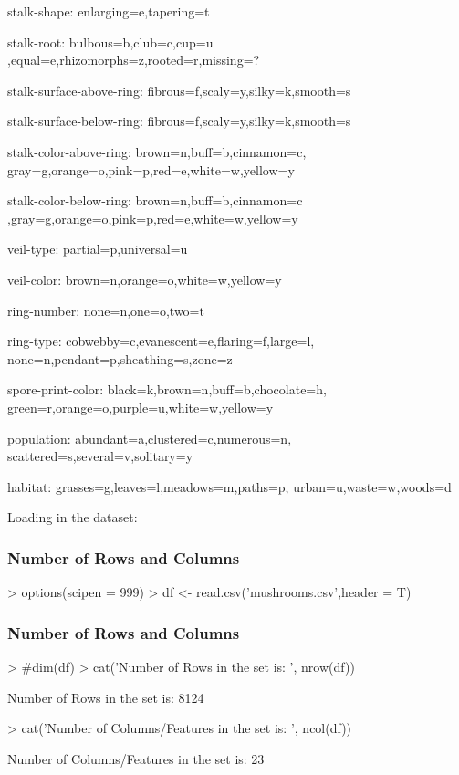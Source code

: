 \documentclass[12pt]{article}         %
\begin{document}
stalk-shape: enlarging=e,tapering=t

stalk-root: bulbous=b,club=c,cup=u
,equal=e,rhizomorphs=z,rooted=r,missing=?

stalk-surface-above-ring: fibrous=f,scaly=y,silky=k,smooth=s

stalk-surface-below-ring: fibrous=f,scaly=y,silky=k,smooth=s

stalk-color-above-ring: brown=n,buff=b,cinnamon=c,
gray=g,orange=o,pink=p,red=e,white=w,yellow=y

stalk-color-below-ring: brown=n,buff=b,cinnamon=c
,gray=g,orange=o,pink=p,red=e,white=w,yellow=y

veil-type: partial=p,universal=u

veil-color: brown=n,orange=o,white=w,yellow=y

ring-number: none=n,one=o,two=t

ring-type: cobwebby=c,evanescent=e,flaring=f,large=l,
none=n,pendant=p,sheathing=s,zone=z

spore-print-color: black=k,brown=n,buff=b,chocolate=h,
green=r,orange=o,purple=u,white=w,yellow=y

population: abundant=a,clustered=c,numerous=n,
scattered=s,several=v,solitary=y

habitat: grasses=g,leaves=l,meadows=m,paths=p,
urban=u,waste=w,woods=d


\pagebreak
Loading in the dataset:
\subsubsection{Number of Rows and Columns}
\begin{Schunk}
\begin{Sinput}
> options(scipen = 999)
> df <- read.csv('mushrooms.csv',header = T)
\end{Sinput}
\end{Schunk}

\subsubsection{Number of Rows and Columns}
\begin{Schunk}
\begin{Sinput}
> #dim(df)
> cat('Number of Rows in the set is: ', nrow(df))
\end{Sinput}
\begin{Soutput}
Number of Rows in the set is:  8124
\end{Soutput}
\begin{Sinput}
> cat('Number of Columns/Features in the set is: ', ncol(df))
\end{Sinput}
\begin{Soutput}
Number of Columns/Features in the set is:  23
\end{Soutput}
\end{Schunk}
\end{document}
